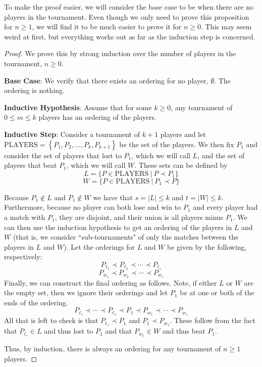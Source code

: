 \documentclass{article}
\theoremstyle{plain}
\theoremstyle{definition}
\begin{document}
To make the proof easier, we will consider the base case to be when there are no players in the tournament. Even though we only need to prove this proposition for \(n \geq 1\), we will find it to be much easier to prove it for \(n \geq 0\). This may seem weird at first, but everything works out as far as the induction step is concerned.

\begin{proof}
    We prove this by strong induction over the number of players in the tournament, \(n \geq 0\).
    
    \textbf{Base Case}: We verify that there exists an ordering for no player, \(\emptyset\). The ordering is nothing.

    \textbf{Inductive Hypothesis}: Assume that for some \(k \geq 0\), any tournament of \(0 \leq m \leq k\) players has an ordering of the players.

    \textbf{Inductive Step}: Consider a tournament of \(k+1\) players and let \(\text{PLAYERS} = \left\{P_1, P_2, \dotsc, P_k, P_{k+1}\right\}\) be the set of the players. We then fix \(P_1\) and consider the set of players that lost to \(P_1\), which we will call \(L\), and the set of players that beat \(P_1\), which we will call \(W\). These sets can be defined by 
    \[L = \{P \in \text{PLAYERS}\ |\ P \prec P_1\}\]
    \[W = \{P \in \text{PLAYERS}\ |\ P_1 \prec P\}\]

    Because \(P_1 \notin L\) and \(P_1 \notin W\) we have that \(s = |L| \leq k\) and \(t = |W| \leq k\). Furthermore, because no player can both lose and win to \(P_1\) and every player had a match with \(P_1\), they are disjoint, and their union is all players minus \(P_1\). We can then use the induction hypothesis to get an ordering of the players in \(L\) and \(W\) (that is, we consider ``sub-tournaments" of only the matches between the players in \(L\) and \(W\)). Let the orderings for \(L\) and \(W\) be given by the following, respectively:
    \[P_{\ell_1} \prec P_{\ell_2} \prec \cdots \prec P_{\ell_s}\]
    \[P_{w_1} \prec P_{w_2} \prec \cdots \prec P_{w_s}\]
    Finally, we can construct the final ordering as follows. Note, if either \(L\) or \(W\) are the empty set, then we ignore their orderings and let \(P_1\) be at one or both of the ends of the ordering.
    \[P_{\ell_1} \prec \cdots \prec P_{\ell_s} \prec P_1 \prec P_{w_1} \prec \cdots \prec P_{w_s}\]
    All that is left to check is that \(P_{\ell_s} \prec P_1\) and \(P_1 \prec P_{w_1}\). These follow from the fact that \(P_{\ell_s} \in L\) and thus lost to \(P_1\) and that \(P_{w_1} \in W\) and thus beat \(P_1\).

    Thus, by induction, there is always an ordering for any tournament of \(n \geq 1\) players.
\end{proof}
\end{document}
